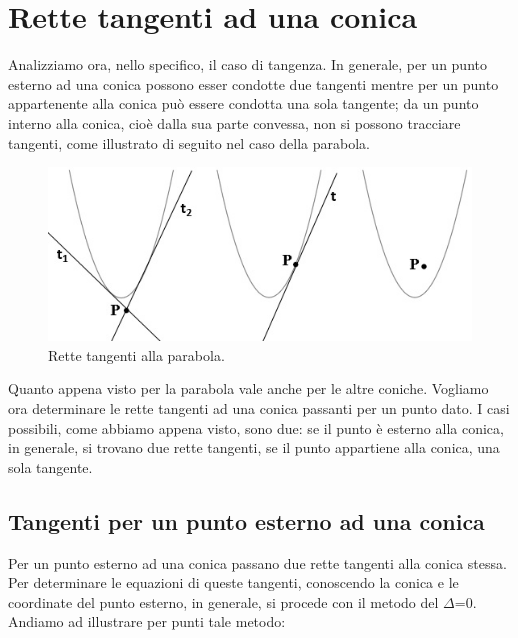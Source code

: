 \section{Rette tangenti ad una conica}
\label{sec:coniche_tangenti}

Analizziamo ora, nello specifico, il caso di tangenza. In generale, per un 
punto esterno ad una conica possono esser condotte due tangenti mentre per 
un punto appartenente alla conica può essere condotta una sola tangente;  
da un punto interno alla conica, cioè dalla sua parte convessa, non si 
possono tracciare tangenti, come illustrato di seguito nel caso della 
parabola. 

\begin{figure}[t]
  \centering
  \includegraphics[scale=0.8]{img/tangenti2.jpg}
  \caption{Rette tangenti alla parabola.}%
\end{figure}

Quanto appena visto per la parabola vale anche per le altre coniche.
Vogliamo ora determinare le rette tangenti ad una conica passanti per un 
punto dato. I casi possibili, come abbiamo appena visto, sono due: se il 
punto è esterno alla conica, in generale, si trovano due rette tangenti, se 
il punto appartiene alla conica, una sola tangente.

\subsection{Tangenti per un punto esterno ad una conica}

Per un punto esterno ad una conica passano due rette tangenti alla conica 
stessa. Per determinare le equazioni di queste tangenti, conoscendo la 
conica e le coordinate del punto esterno, in generale, si procede con il 
metodo del $ \Delta $=0. Andiamo ad illustrare per punti tale metodo:

